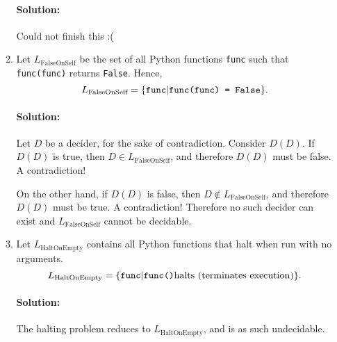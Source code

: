 \documentclass{article}
\begin{document}
\begin{enumerate}
\begin{enumerate}[label= (\alph*)]
                    \paragraph{Solution: }

                    

                    Could not finish this :(
                    \newpage
                \item Let $L_\text{FalseOnSelf}$ be the set of all Python functions \verb|func| such that \verb|func(func)| returns \verb|False|. Hence,
                \[
                L_\text{FalseOnSelf} = \{\verb|func|| \verb|func(func) = False|\} 
                .\] 
                
                \paragraph{Solution: } Let $D$ be a decider, for the sake of contradiction. Consider $D(D)$. If $D(D)$ is true, then $D\in L_{\text{FalseOnSelf}}$, and therefore $D(D)$ must be false. A contradiction!

                On the other hand, if $D(D)$ is false, then $D\not\in L_{\text{FalseOnSelf}}$, and therefore $D(D)$ must be true. A contradiction! Therefore no such decider can exist and $L_\text{FalseOnSelf}$ cannot be decidable.

            \item Let $L_\text{HaltOnEmpty}$ contains all Python functions that halt when run with no arguments.
                \[
                L_\text{HaltOnEmpty} = \{\verb |func| | \verb|func()| \text{halts (terminates execution)}\} 
                .\] 
                \paragraph{Solution: }The halting problem reduces to $L_\text{HaltOnEmpty}$, and is as such undecidable.
        \end{enumerate}
\end{enumerate}
\end{document}
